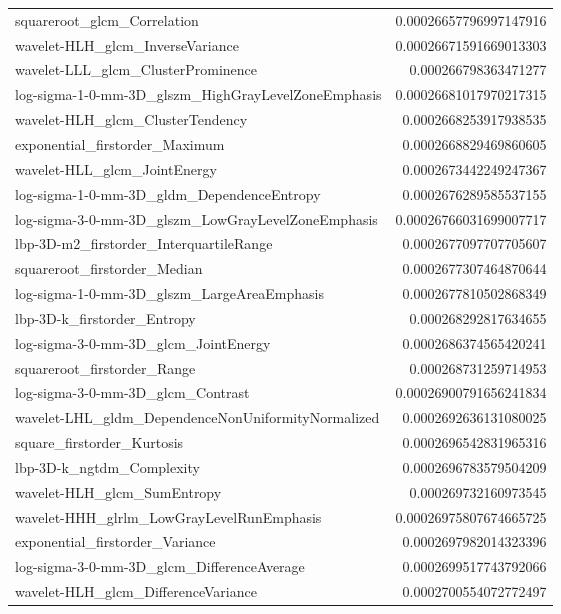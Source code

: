 {\begin{xltabular}[H]{\textwidth}{X r}
        squareroot\_glcm\_Correlation & 0.00026657796997147916 \\
        wavelet-HLH\_glcm\_InverseVariance & 0.00026671591669013303 \\
        wavelet-LLL\_glcm\_ClusterProminence & 0.000266798363471277 \\
        log-sigma-1-0-mm-3D\_glszm\_HighGrayLevelZoneEmphasis & 0.00026681017970217315 \\
        wavelet-HLH\_glcm\_ClusterTendency & 0.0002668253917938535 \\
        exponential\_firstorder\_Maximum & 0.0002668829469860605 \\
        wavelet-HLL\_glcm\_JointEnergy & 0.0002673442249247367 \\
        log-sigma-1-0-mm-3D\_gldm\_DependenceEntropy & 0.0002676289585537155 \\
        log-sigma-3-0-mm-3D\_glszm\_LowGrayLevelZoneEmphasis & 0.00026766031699007717 \\
        lbp-3D-m2\_firstorder\_InterquartileRange & 0.0002677097707705607 \\
        squareroot\_firstorder\_Median & 0.0002677307464870644 \\
        log-sigma-1-0-mm-3D\_glszm\_LargeAreaEmphasis & 0.0002677810502868349 \\
        lbp-3D-k\_firstorder\_Entropy & 0.000268292817634655 \\
        log-sigma-3-0-mm-3D\_glcm\_JointEnergy & 0.0002686374565420241 \\
        squareroot\_firstorder\_Range & 0.000268731259714953 \\
        log-sigma-3-0-mm-3D\_glcm\_Contrast & 0.00026900791656241834 \\
        wavelet-LHL\_gldm\_DependenceNonUniformityNormalized & 0.0002692636131080025 \\
        square\_firstorder\_Kurtosis & 0.0002696542831965316 \\
        lbp-3D-k\_ngtdm\_Complexity & 0.0002696783579504209 \\
        wavelet-HLH\_glcm\_SumEntropy & 0.000269732160973545 \\
        wavelet-HHH\_glrlm\_LowGrayLevelRunEmphasis & 0.00026975807674665725 \\
        exponential\_firstorder\_Variance & 0.0002697982014323396 \\
        log-sigma-3-0-mm-3D\_glcm\_DifferenceAverage & 0.0002699517743792066 \\
        wavelet-HLH\_glcm\_DifferenceVariance & 0.0002700554072772497 \\

\end{xltabular}}
